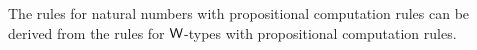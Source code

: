 \documentclass[hott-all.tex]{subfiles}
\begin{document}
% 
% 
% 
% 
\begin{thm}
The rules for natural numbers with propositional computation rules can be derived from the rules for $\mathsf{W}$-types with propositional computation rules.
\end{thm}
% 
% 
\end{document}
